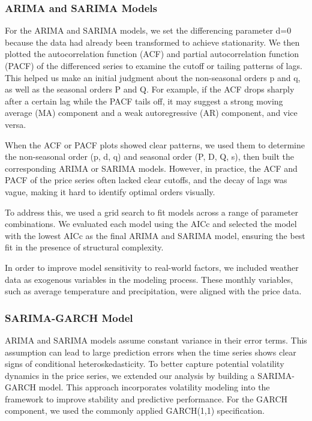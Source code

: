 \documentclass[10pt]{article}
\begin{document}
\subsubsection{ARIMA and SARIMA Models}
For the ARIMA and SARIMA models, we set the differencing parameter d=0 because the data had already been transformed to achieve stationarity. We then plotted the autocorrelation function (ACF) and partial autocorrelation function (PACF) of the differenced series to examine the cutoff or tailing patterns of lags. This helped us make an initial judgment about the non-seasonal orders p and q, as well as the seasonal orders P and Q. For example, if the ACF drops sharply after a certain lag while the PACF tails off, it may suggest a strong moving average (MA) component and a weak autoregressive (AR) component, and vice versa.

\noindent
When the ACF or PACF plots showed clear patterns, we used them to determine the non-seasonal order (p, d, q) and seasonal order (P, D, Q, s), then built the corresponding ARIMA or SARIMA models. However, in practice, the ACF and PACF of the price series often lacked clear cutoffs, and the decay of lags was vague, making it hard to identify optimal orders visually.

\noindent
To address this, we used a grid search to fit models across a range of parameter combinations. We evaluated each model using the AICc and selected the model with the lowest AICc as the final ARIMA and SARIMA model, ensuring the best fit in the presence of structural complexity.

\noindent
In order to improve model sensitivity to real-world factors, we included weather data as exogenous variables in the modeling process. These monthly variables, such as average temperature and precipitation, were aligned with the price data.

\subsubsection{SARIMA-GARCH Model}
ARIMA and SARIMA models assume constant variance in their error terms. This assumption can lead to large prediction errors when the time series shows clear signs of conditional heteroskedasticity. To better capture potential volatility dynamics in the price series, we extended our analysis by building a SARIMA-GARCH model. This approach incorporates volatility modeling into the framework to improve stability and predictive performance. For the GARCH component, we used the commonly applied GARCH(1,1) specification.
\end{document}
